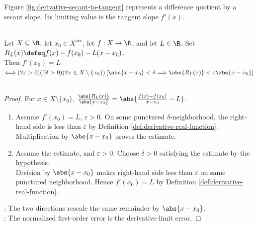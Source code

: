 \noindent Figure \ref{fig:derivative-secant-to-tangent} represents a difference quotient by a secant slope. Its limiting value is the tangent slope $f'(x)$.

\begin{illustrationfigure}[H]
  \centering
  
  \caption{The secant through $(x,f(x))$ and $(t,f(t))$ has slope $\frac{f(t)-f(x)}{t-x}$; its limit is $f'(x)$.}
  \label{fig:derivative-secant-to-tangent}
\end{illustrationfigure}

\begin{proposition} \label{prop:one-variable-first-order-approximation} \\
Let $X\subseteq\R$, let $x_0\in X^{\operatorname{acc}}$, let $f:X\to\R$, and let $L\in\R$. Set $R_L(x)\defeq f(x)-f(x_0)-L(x-x_0)$.\\
Then $f'(x_0)=L$ $\Longleftrightarrow(\forall\varepsilon>0)(\exists\delta>0)(\forall x\in X\setminus\{x_0\})\,[\abs{x-x_0}<\delta\Longrightarrow\abs{R_L(x)}<\varepsilon\abs{x-x_0}]$.
\begin{proof}
For $x\in X\setminus\{x_0\}$, $\frac{\abs{R_L(x)}}{\abs{x-x_0}}=\abs{\frac{f(x)-f(x_0)}{x-x_0}-L}$.
\begin{enumerate}[label=\roman*.]
\setlength{\itemsep}{0pt}
\item[$(\Rightarrow)$] Assume $f'(x_0)=L$, $\varepsilon>0$. On some punctured $\delta$-neighborhood, the right-hand side is less than $\varepsilon$ by Definition \ref{def:derivative-real-function}.\\
Multiplication by $\abs{x-x_0}$ proves the estimate.
\item[$(\Leftarrow)$] Assume the estimate, and $\varepsilon>0$. Choose $\delta>0$ satisfying the estimate by the hypothesis.\\
Division by $\abs{x-x_0}$ makes right-hand side less than $\varepsilon$ on same punctured neighborhood. Hence $f'(x_0)=L$ by Definition \ref{def:derivative-real-function}.
\end{enumerate}
: The two directions rescale the same remainder by $\abs{x-x_0}$.\\
: The normalized first-order error is the derivative-limit error.
\end{proof}
\end{proposition}

